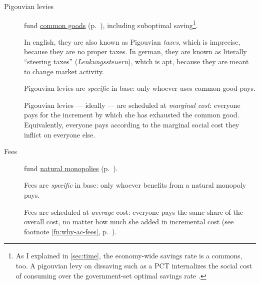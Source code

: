 \begin{description}
	\item[Pigouvian levies]  \label{sec:levies} fund \hyperref[sec:common-good]{common goods} (p.~\pageref{sec:common-good}), including suboptimal saving\footnote{
		As I explained in \autoref{sec:time}, the economy-wide savings rate is a commons, too. A pigouvian levy on dissaving such as a \gls{PCT} internalizes the social cost of consuming over the government-set optimal savings rate \citep{Held2010a}.}. %

	In english, they are also known as Pigouvian \emph{taxes}, which is imprecise, because they are no proper taxes. In german, they are known as literally ``steering taxes'' (\emph{Lenkungssteuern}), which is apt, because they are meant to change market activity.

	Pigouvian levies are \emph{specific} in base: only whoever uses common good pays. 
	
	Pigouvian levies --- ideally --- are scheduled at \emph{marginal cost}: everyone pays for the increment by which she has exhausted the common good. Equivalently, everyone pays according to the marginal social cost they inflict on everyone else. 
	



	\item[Fees]  \label{sec:fees}
	fund \hyperref[sec:natural-monopoly]{natural monopolies} (p.~\pageref{sec:natural-monopoly}). 
	
	Fees are \emph{specific} in base: only whoever benefits from a natural monopoly pays. 
	
	Fees are scheduled at \emph{average} cost: everyone pays the same share of the overall cost, no matter how much she added in incremental cost (see footnote \ref{fn:why-ac-fees}, p.~\pageref{fn:why-ac-fees}). 


\end{description}

